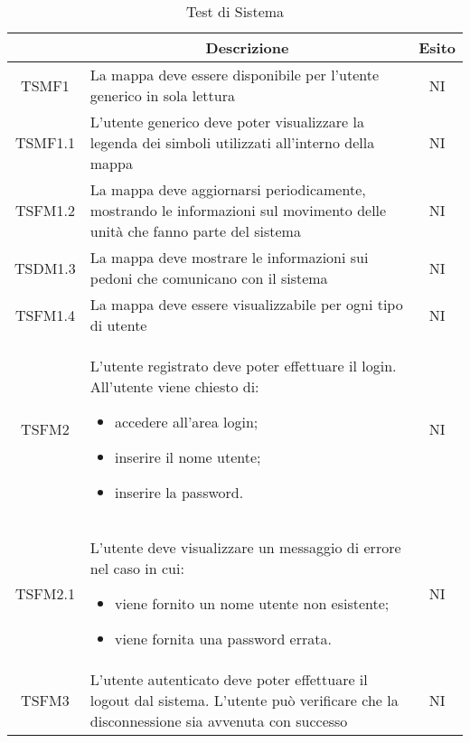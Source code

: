 	\newcommand*{\thead}[1]{\multicolumn{1}{c}{\bfseries #1}}	
	\setlength{\tabcolsep}{10pt}
	\begin{longtable}[h!] { c  m{12cm} c}
		\caption{Test di Sistema} \\
		\rowcolor{lightgray}
		\thead{Test}  & \thead{Descrizione} & \thead{Esito} \\ \endhead%
	
		TSMF1   & La mappa deve essere disponibile per l'utente generico in sola lettura	& NI \\
		
		TSMF1.1 & L'utente generico deve poter visualizzare la legenda dei simboli utilizzati all'interno della mappa & NI \\
		
		TSFM1.2 & La mappa deve aggiornarsi periodicamente, mostrando le informazioni sul movimento delle unità che fanno parte del sistema & NI\\
		
		TSDM1.3 & La mappa deve mostrare le informazioni sui pedoni che comunicano con il sistema & NI \\
		
		TSFM1.4 & La mappa deve essere visualizzabile per ogni tipo di utente & NI\\
		
		
		TSFM2   & L'utente registrato deve poter effettuare il login. All'utente viene chiesto di:
				\begin{itemize}
					\item accedere all'area login;
					\item inserire il nome utente;
					\item inserire la password.
				\end{itemize}
								& NI \\
								
		TSFM2.1 & L'utente deve visualizzare un messaggio di errore nel caso in cui:
					\begin{itemize}
						\item viene fornito un nome utente non esistente;
						\item viene fornita una password errata.
					\end{itemize}
									& NI \\		
		TSFM3   & L'utente autenticato deve poter effettuare il logout dal sistema. L'utente può verificare che la disconnessione sia avvenuta con successo & NI \\
		

\end{longtable}
